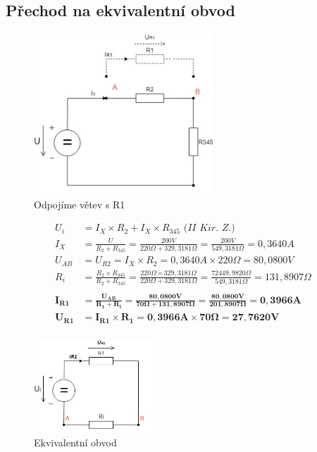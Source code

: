 \subsection{Přechod na ekvivalentní obvod}
\begin{figure}[H]
    \centering
    \includegraphics[width=0.6\textwidth]{fig/Pr2_3.png}
    \caption{Odpojíme větev s R1}
\end{figure}

\begin{align*}
U_i &= I_X \times R_2 + I_X \times R_{345} \textit{ (II Kir. Z.)}\\
I_X &= \frac {U} {R_2 + R_{345}} = \frac {200 V} {220\Omega + 329,3181\Omega} = \frac {200 V} {549,3181\Omega} = 0,3640 A\\
U_{AB} &= U_{R2} = I_X \times R_2 = 0,3640 A \times 220\Omega = 80,0800 V\\
R_i &= \frac {R_2 \times R_{345}} {R_2 + R_{345}} = \frac {220\Omega \times 329,3181\Omega} {220\Omega + 329,3181\Omega} = \frac {72 449,9820\Omega} {549,3181\Omega} = 131,8907\Omega\\ \\
\boldsymbol{I_{R1} }&=\boldsymbol{ \frac {U_{AB}} {R_1 + R_i} = \frac {80,0800 V} {70\Omega + 131,8907\Omega} = \frac {80,0800 V} {201,8907\Omega} = 0,3966 A}\\
\boldsymbol{U_{R1} }&=\boldsymbol{ I_{R1} \times R_1 = 0,3966 A \times 70\Omega = 27,7620 V}\\
\end{align*}

\begin{figure}[H]
    \centering
    \includegraphics[width=0.4\textwidth]{fig/Pr2_4.jpg}
    \caption{Ekvivalentní obvod}
\end{figure}